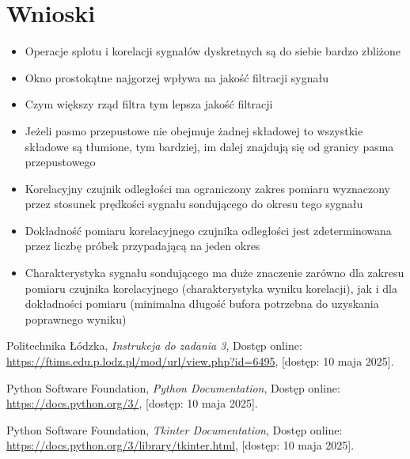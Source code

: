 \documentclass{article}
\begin{document}
\section{Wnioski} {
    \begin{itemize}
        \item Operacje splotu i korelacji sygnałów dyskretnych są do siebie bardzo
            zbliżone
        \item Okno prostokątne najgorzej wpływa na jakość filtracji sygnału
        \item Czym większy rząd filtra tym lepsza jakość filtracji
        \item Jeżeli pasmo przepustowe nie obejmuje żadnej składowej to wszystkie
            składowe są tłumione, tym bardziej, im dalej znajdują się od granicy pasma
            przepustowego
        \item Korelacyjny czujnik odległości ma ograniczony zakres pomiaru wyznaczony
            przez stosunek prędkości sygnału sondującego do okresu tego sygnału
        \item Dokładność pomiaru korelacyjnego czujnika odległości jest zdeterminowana
            przez liczbę próbek przypadającą na jeden okres
        \item Charakterystyka sygnału sondującego ma duże znaczenie zarówno dla
            zakresu pomiaru czujnika korelacyjnego (charakterystyka wyniku korelacji),
            jak i dla dokładności pomiaru (minimalna długość bufora potrzebna do
            uzyskania poprawnego wyniku)
    \end{itemize}
}


\begin{thebibliography}{9}

    Politechnika Łódzka, 
    \emph{Instrukcja do zadania 3}, 
    Dostęp online: \url{https://ftims.edu.p.lodz.pl/mod/url/view.php?id=6495}, 
    [dostęp: 10 maja 2025].


    Python Software Foundation, 
    \emph{Python Documentation}, 
    Dostęp online: \url{https://docs.python.org/3/}, 
    [dostęp: 10 maja 2025].

    Python Software Foundation, 
    \emph{Tkinter Documentation}, 
    Dostęp online: \url{https://docs.python.org/3/library/tkinter.html}, 
    [dostęp: 10 maja 2025].

\end{thebibliography}
\end{document}
